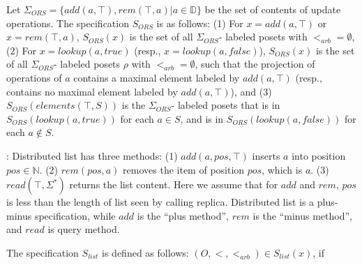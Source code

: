 Let $\Sigma_{\textit{ORS}} = \{ add(a,\top),rem(\top,a) \vert a \in \mathbb{D} \}$ be the set of contents of update operations. The specification $S_{\textit{ORS}}$ is as follows: (1) For $x=add(a,\top)$ or $x = rem(\top,a)$, $S_{\textit{ORS}}(x)$ is the set of all $\Sigma_{\textit{ORS}}$- labeled posets with $<_{\textit{arb}} = \emptyset$, (2) For $x=lookup(a,\textit{true})$ (resp., $x=lookup(a,\textit{false})$), $S_{\textit{ORS}}(x)$ is the set of all $\Sigma_{\textit{ORS}}$- labeled posets $\rho$ with $<_{\textit{arb}} = \emptyset$, such that the projection of operations of $a$ contains a maximal element labeled by $add(a,\top)$ (resp., contains no maximal element labeled by $add(a,\top)$), and (3) $S_{\textit{ORS}}(elements(\top,S))$ is the $\Sigma_{\textit{ORS}}$- labeled posets that is in $S_{\textit{ORS}}(lookup(a,\textit{true}))$ for each $a \in S$, and is in $S_{\textit{ORS}}(lookup(a,\textit{false}))$ for each $a \notin S$. 

: Distributed list has three methods: (1) $add(a,pos,\top)$ inserts $a$ into position $pos \in \mathbb{N}$. (2) $rem(pos,a)$ removes the item of position $pos$, which is $a$. (3) $read(\top,\Sigma^*)$ returns the list content. Here we assume that for $add$ and $rem$, $pos$ is less than the length of list seen by calling replica. Distributed list is a plus-minus specification, while $add$ is the ``plus method'', $rem$ is the ``minus method'', and $read$ is query method.

The specification $S_{\textit{list}}$ is defined as follows: $(O,<,<_{\textit{arb}}) \in S_{\textit{list}}(x)$, if

